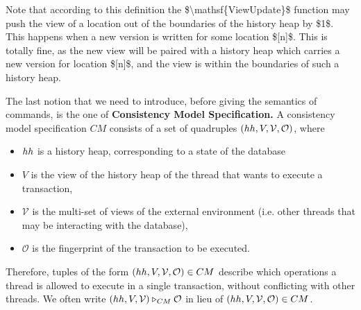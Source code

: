 \documentclass[a4paper,UKenglish]{article}%
\theoremstyle{plain}
\begin{document}
\ac{Note that according to this definition the $\mathsf{ViewUpdate}$ function may push the view of a 
location out of the boundaries of the history heap by $1$. This happens when a new version is written 
for some location $[n]$. This is totally fine, as the new view will be paired with a history heap which 
carries a new version for location $[n]$, and the view is within the boundaries of such a history heap.}


The last notion that we need to introduce, before giving the semantics of commands, 
is the one of \textbf{Consistency Model Specification.} 
A consistency model specification $CM$ consists of a set of quadruples 
$(hh, V, \mathcal{V}, \mathcal{O})$, where 
\begin{itemize}
\item $hh$ is a history heap, corresponding to a state of the database
\item $V$ is the view of the history heap of the thread that wants to execute a 
transaction, 
\item $\mathcal{V}$ is the multi-set of views of the external environment (i.e. other 
threads that may be interacting with the database), 
\item $\mathcal{O}$ is the fingerprint of the transaction to be executed.
\end{itemize}
Therefore, tuples of the form $(hh, V, \mathcal{V}, \mathcal{O}) \in CM$ describe 
which operations a thread is allowed to execute in a single transaction, without conflicting 
with other threads. We often write $(hh, V, \mathcal{V}) \triangleright_{CM} \mathcal{O}$ 
in lieu of $(hh, V, \mathcal{V}, \mathcal{O}) \in CM$.
\end{document}
